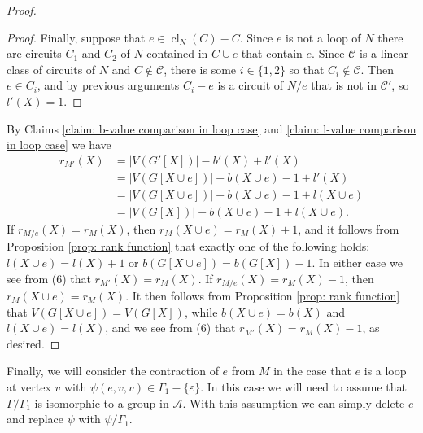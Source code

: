\documentclass[12pt]{article}
\theoremstyle{definition}
\newcommand{\cA}{\mathcal{A}}
\newcommand{\cC}{\mathcal{C}}
\newcommand{\ep}{\varepsilon}
\DeclareMathOperator{\cl}{cl}
\begin{document}
\begin{proof}
\begin{proof}
Finally, suppose that $e \in \cl_N(C) - C$.
Since $e$ is not a loop of $N$ there are circuits $C_1$ and $C_2$ of $N$ contained in $C \cup e$ that contain $e$.
Since $\cC$ is a linear class of circuits of $N$ and $C \notin \cC$, there is some $i \in \{1,2\}$ so that $C_i \notin \cC$.
Then $e \in C_i$, and by previous arguments $C_i - e$ is a circuit of $N/e$ that is not in $\cC'$, so $l'(X) = 1$.
\end{proof}



By Claims \ref{claim: b-value comparison in loop case} and \ref{claim: l-value comparison in loop case} we have
\begin{align}
    r_{M'}(X) &= |V(G'[X])| - b'(X) + l'(X) \\
    &= |V(G[X \cup e])| - b(X \cup e) - 1 + l'(X) \\
    &= |V(G[X \cup e])| - b(X \cup e) - 1 + l(X \cup e) \\
    &= |V(G[X])| - b(X \cup e) - 1 + l(X \cup e).
\end{align}
If $r_{M/e}(X) = r_M(X)$, then $r_M(X \cup e) = r_M(X) + 1$, and it follows from Proposition \ref{prop: rank function} that exactly one of the following holds: $l(X \cup e) = l(X) + 1$ or $b(G[X \cup e]) = b(G[X]) - 1$.
In either case we see from (6) that $r_{M'}(X) = r_M(X)$.
If $r_{M/e}(X) = r_M(X) - 1$, then $r_M(X \cup e) = r_M(X)$.
It then follows from Proposition \ref{prop: rank function} that $V(G[X \cup e]) = V(G[X])$, while $b(X \cup e) = b(X)$ and $l(X \cup e) = l(X)$, and we see from (6) that $r_{M'}(X) = r_M(X) - 1$, as desired.
\end{proof}




Finally, we will consider the contraction of $e$ from $M$ in the case that $e$ is a loop at vertex $v$ with $\psi(e, v, v) \in \Gamma_1 - \{\ep\}$.
In this case we will need to assume that $\Gamma/\Gamma_1$ is isomorphic to a group in $\cA$.
With this assumption we can simply delete $e$ and replace $\psi$ with $\psi/\Gamma_1$.
\end{document}
